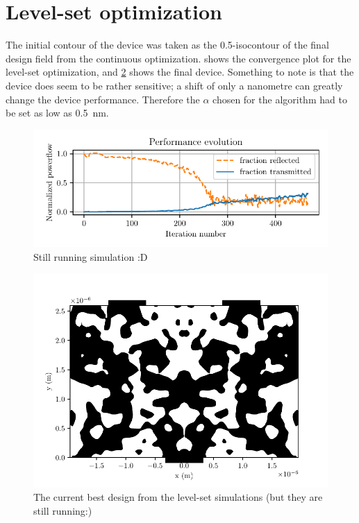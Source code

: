 \section{Level-set optimization}\label{sec:res_bin}

The initial contour of the device was taken as the 0.5-isocontour of the final
design field from the continuous optimization.
 shows the convergence plot for the level-set optimization,
and \cref{fig:bin_design} shows the final device.
Something to note is that the device does seem to be rather sensitive;
a shift of only a nanometre can greatly change the device performance.
Therefore the $\alpha$ chosen for the algorithm had to be set as low as
\qty{0.5}{\nm}.

\begin{figure}[htpb]
	\centering
	\includegraphics{chapters/results/conv_tmp.pdf}
	\caption{Still running simulation :D}%
	\label{fig:bin_conv}
\end{figure}

\begin{figure}[htpb]
	\centering
	\includegraphics{chapters/results/bin_design_tmp_254.pdf}
	\caption{%
		The current best design from the level-set simulations (but they are
		still running:)
	}%
	\label{fig:bin_design}
\end{figure}
